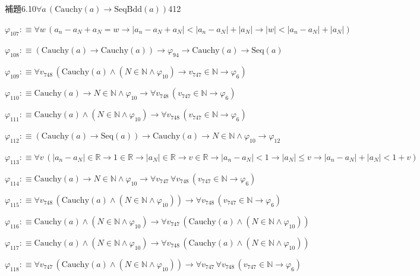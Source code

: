 \begin{fullproof}{補題6.10}{$\forall a\,(\mathrm{Cauchy}(a) \to \mathrm{SeqBdd}(a))$}{412}
\begin{abbrevlist}
\item $\varphi_{107} :\equiv \forall w\,(a_{n} - a_{N} + a_{N} = w \to \lvert a_{n} - a_{N} + a_{N} \rvert < \lvert a_{n} - a_{N} \rvert + \lvert a_{N} \rvert \to \lvert w \rvert < \lvert a_{n} - a_{N} \rvert + \lvert a_{N} \rvert)$
\item $\varphi_{108} :\equiv (\mathrm{Cauchy}(a) \to \mathrm{Cauchy}(a)) \to \varphi_{94} \to \mathrm{Cauchy}(a) \to \mathrm{Seq}(a)$
\item $\varphi_{109} :\equiv \forall v_{748}\,(\mathrm{Cauchy}(a) \land (N \in \mathbb{N} \land \varphi_{10}) \to v_{747} \in \mathbb{N} \to \varphi_{6})$
\item $\varphi_{110} :\equiv \mathrm{Cauchy}(a) \to N \in \mathbb{N} \land \varphi_{10} \to \forall v_{748}\,(v_{747} \in \mathbb{N} \to \varphi_{6})$
\item $\varphi_{111} :\equiv \mathrm{Cauchy}(a) \land (N \in \mathbb{N} \land \varphi_{10}) \to \forall v_{748}\,(v_{747} \in \mathbb{N} \to \varphi_{6})$
\item $\varphi_{112} :\equiv (\mathrm{Cauchy}(a) \to \mathrm{Seq}(a)) \to \mathrm{Cauchy}(a) \to N \in \mathbb{N} \land \varphi_{10} \to \varphi_{12}$
\item $\varphi_{113} :\equiv \forall v\,(\lvert a_{n} - a_{N} \rvert \in \mathbb{R} \to 1 \in \mathbb{R} \to \lvert a_{N} \rvert \in \mathbb{R} \to v \in \mathbb{R} \to \lvert a_{n} - a_{N} \rvert < 1 \to \lvert a_{N} \rvert \leq v \to \lvert a_{n} - a_{N} \rvert + \lvert a_{N} \rvert < 1 + v)$
\item $\varphi_{114} :\equiv \mathrm{Cauchy}(a) \to N \in \mathbb{N} \land \varphi_{10} \to \forall v_{747}\,\forall v_{748}\,(v_{747} \in \mathbb{N} \to \varphi_{6})$
\item $\varphi_{115} :\equiv \forall v_{748}\,(\mathrm{Cauchy}(a) \land (N \in \mathbb{N} \land \varphi_{10})) \to \forall v_{748}\,(v_{747} \in \mathbb{N} \to \varphi_{6})$
\item $\varphi_{116} :\equiv \mathrm{Cauchy}(a) \land (N \in \mathbb{N} \land \varphi_{10}) \to \forall v_{747}\,(\mathrm{Cauchy}(a) \land (N \in \mathbb{N} \land \varphi_{10}))$
\item $\varphi_{117} :\equiv \mathrm{Cauchy}(a) \land (N \in \mathbb{N} \land \varphi_{10}) \to \forall v_{748}\,(\mathrm{Cauchy}(a) \land (N \in \mathbb{N} \land \varphi_{10}))$
\item $\varphi_{118} :\equiv \forall v_{747}\,(\mathrm{Cauchy}(a) \land (N \in \mathbb{N} \land \varphi_{10})) \to \forall v_{747}\,\forall v_{748}\,(v_{747} \in \mathbb{N} \to \varphi_{6})$

\end{abbrevlist}
\end{fullproof}
